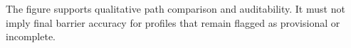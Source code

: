 The figure supports qualitative path comparison and auditability. It must not imply final barrier accuracy for profiles that remain flagged as provisional or incomplete.
